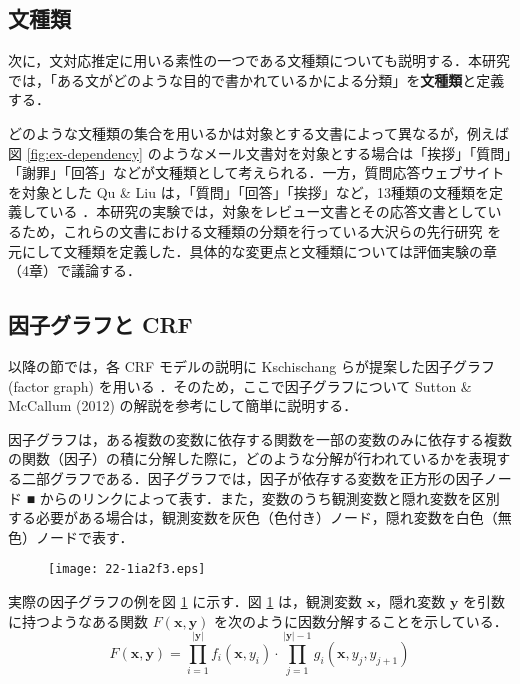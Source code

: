 \documentclass[japanese]{jnlp_1.4}
\begin{document}
\subsection{文種類}

次に，文対応推定に用いる素性の一つである文種類についても説明する．本研究では，「ある文がどのような目的で書かれているかによる分類」を\textbf{文種類}と定義する．

どのような文種類の集合を用いるかは対象とする文書によって異なるが，例えば図 \ref{fig:ex-dependency} のようなメール文書対を対象とする場合は「挨拶」「質問」「謝罪」「回答」などが文種類として考えられる．一方，質問応答ウェブサイトを対象とした Qu \& Liu は，「質問」「回答」「挨拶」など，13種類の文種類を定義している \cite{Zhonghua2012}．本研究の実験では，対象をレビュー文書とその応答文書としているため，これらの文書における文種類の分類を行っている大沢らの先行研究 \cite{大沢:2010} を元にして文種類を定義した．具体的な変更点と文種類については評価実験の章（4章）で議論する．


\subsection{因子グラフと CRF} \label{sec:factor-graph}

以降の節では，各 CRF モデルの説明に Kschischang らが提案した因子グラフ (factor graph) を用いる \cite{Kschischang2001}．そのため，ここで因子グラフについて Sutton \& McCallum (2012) の解説を参考にして簡単に説明する．

因子グラフは，ある複数の変数に依存する関数を一部の変数のみに依存する複数の関数（因子）の積に分解した際に，どのような分解が行われているかを表現する二部グラフである．因子グラフでは，因子が依存する変数を正方形の因子ノード ■ からのリンクによって表す．また，変数のうち観測変数と隠れ変数を区別する必要がある場合は，観測変数を灰色（色付き）ノード，隠れ変数を白色（無色）ノードで表す．

\begin{figure}[b]
\begin{center}
\texttt{[image: 22-1ia2f3.eps]}
\end{center}
\label{fig:L-CRF}
\end{figure}

実際の因子グラフの例を図 \ref{fig:L-CRF} に示す．図 \ref{fig:L-CRF} は，観測変数 $\bm{x}$，隠れ変数 $\bm{y}$ を引数に持つようなある関数 $F(\bm{x},\bm{y})$ を次のように因数分解することを示している．
\begin{equation}
  F(\bm{x},\bm{y}) = \prod_{i=1}^{|\bm{y}|} f_i(\bm{x},y_i) \cdot \prod_{j=1}^{|\bm{y}|-1} g_i(\bm{x},y_{j},y_{j+1})
\end{equation}
\end{document}
